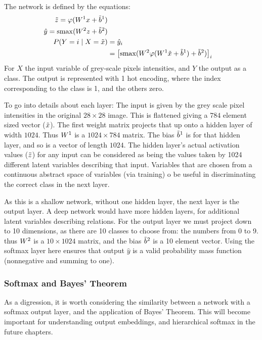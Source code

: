 \documentclass[12pt,parskip]{komatufte}
\begin{document}
The network is defined by the equations:
\begin{align}
\v z=\varphi(\d W_1 x + \dv b_1) \\
\hat{y}=\softmax(\d W_2 z + \dv b_2) \\
P(Y=i\mid X=\v x) &= \hat{y}_i \\
&= \left[\softmax(\d W_2 \varphi(\d W_1 \v x + \dv b_1)+\dv b_2)\right]_i
\end{align}
For $X$ the input variable of grey-scale pixels intensities, and $Y$ the output as a class.
The output is represented with 1 hot encoding, where the index corresponding to the class is 1, and the others zero.



To go into details about each layer:
The input is given by the grey scale pixel intensities in the original $28\times 28$ image.
This is flattened giving a $784$ element sized vector ($\tilde{x}$).
The first weight matrix projects that up onto a hidden layer  of width $1024$.
Thus $\d W_1$ is a $1024\times 784$ matrix.
The bias $\d {\v b}_1$ is for that hidden layer, and so is a vector of length $1024$.
The hidden layer's actual activation values ($\tilde{z}$) for any input can be considered as being the values taken by 1024 different latent variables describing that input.
Variables that are chosen  from a continuous abstract space of variables (via training) o be useful in discriminating the correct class in the next layer.

As this is a shallow network, without one hidden layer, the next layer is the output layer.
A deep network would have more hidden layers, for additional latent variables describing relations.
For the output layer we must project down to 10 dimensions, as there are 10 classes to choose from: the numbers from 0 to 9.
thus $\d W_2$ is a $10 \times 1024$ matrix,
and the bias $\dv b_2$ is a 10 element vector.
Using the softmax layer here ensures that output $\hat{y}$ is a valid probability mass function (nonnegative and summing to one).


\subsubsection{Softmax and Bayes' Theorem}\label{sec:softmax-and-bayes-theorem}
As a digression, it is worth considering the similarity between a network with a softmax output layer, and the application of Bayes' Theorem.
This will become important for understanding output embeddings, and hierarchical softmax in the future chapters.
\end{document}
